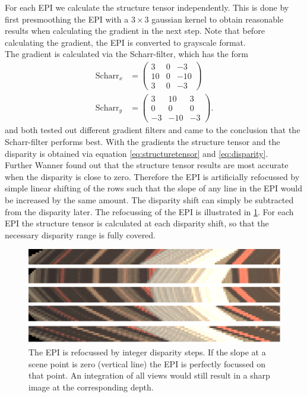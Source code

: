 \documentclass  [
  paper    = a4,
  BCOR     = 10mm,
  twoside,
  fontsize = 12pt,
  fleqn,
  toc      = bibnumbered,
  toc      = listofnumbered,
  numbers  = noendperiod,
  headings = normal,
  listof   = leveldown,
  version  = 3.03
]                                       {scrreprt}
\begin{document}
 For each EPI we calculate the structure tensor independently. This is done by first presmoothing the EPI with a $3\times3$ gaussian kernel to obtain reasonable results when calculating the gradient in the next step. Note that before calculating the gradient, the EPI is converted to grayscale format.\\
 The gradient is calculated via the Scharr-filter, which has the form
 \begin{align}\label{key}
 \text{Scharr}_x &= \left(\begin{matrix}
 3&0&-3\\
 10&0&-10\\
 3&0&-3
 \end{matrix}\right)
\\
 \text{Scharr}_y &= \left(\begin{matrix}
 3&10&3\\
 0&0&0\\
 -3&-10&-3
 \end{matrix}\right).
 \end{align}
 \cite{wanner2014orientation} and \cite{diebold2016light} both tested out different gradient filters and came to the conclusion that the Scharr-filter performs best. With the gradients the structure tensor and the disparity is obtained via equation \ref{eq:structuretensor} and \ref{eq:disparity}.\\
 Further Wanner found out that the structure tensor results are most accurate when the disparity is close to zero. Therefore the EPI is artificially refocussed by simple linear shifting of the rows such that the slope of any line in the EPI would be increased by the same amount. The disparity shift can simply be subtracted from the disparity later. The refocussing of the EPI is illustrated in \ref{fig:refocusedcut}. For each EPI the structure tensor is calculated at each disparity shift, so that the necessary disparity range is fully covered.  \\
 \begin{figure}
 	\centering
 	\includegraphics[width=0.7\linewidth]{images/refocused_cut}
 	\caption[Refocussed EPI]{The EPI is refocussed by integer disparity steps. If the slope at a scene point is zero (vertical line) the EPI is perfectly focussed on that point. An integration of all views would still result in a sharp image at the corresponding depth.}
 	\label{fig:refocusedcut}
 \end{figure}
 
\end{document}
